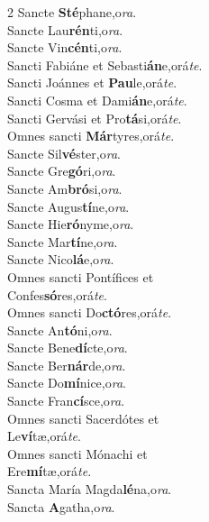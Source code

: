 \begin{multicols}{2}
San\-cte \textbf{Sté}phane,\hfill o\textit{ra}.\\
San\-cte Lau\textbf{rén}ti,\hfill o\textit{ra}.\\
San\-cte Vin\textbf{cén}ti,\hfill o\textit{ra}.\\
San\-cti Fabiáne et Sebasti\textbf{án}e,\hfill orá\textit{te}.\\
San\-cti Joánnes et \textbf{Pau}le,\hfill orá\textit{te}.\\
San\-cti Cosma et Dami\textbf{án}e,\hfill orá\textit{te}.\\
San\-cti Gervási et Pro\textbf{tá}si,\hfill orá\textit{te}.\\
Omnes san\-cti \textbf{Már}tyres,\hfill orá\textit{te}.\\
San\-cte Sil\textbf{vé}ster,\hfill o\textit{ra}.\\
San\-cte Gre\textbf{gó}ri,\hfill o\textit{ra}.\\
San\-cte Am\textbf{bró}si,\hfill o\textit{ra}.\\
San\-cte Augus\textbf{tí}ne,\hfill o\textit{ra}.\\
San\-cte Hie\textbf{ró}nyme,\hfill o\textit{ra}.\\
San\-cte Mar\textbf{tí}ne,\hfill o\textit{ra}.\\
San\-cte Nico\textbf{lá}e,\hfill o\textit{ra}.\\
Omnes san\-cti Pontífices et \\ \emspace Confes\textbf{só}res,\hfill orá\textit{te}.\\
Omnes san\-cti Do\textbf{ctó}res,\hfill orá\textit{te}.\\
San\-cte An\textbf{tó}ni,\hfill o\textit{ra}.\\
San\-cte Bene\textbf{dí}cte,\hfill o\textit{ra}.\\
San\-cte Ber\textbf{nár}de,\hfill o\textit{ra}.\\
San\-cte Do\textbf{mí}nice,\hfill o\textit{ra}.\\
San\-cte Fran\textbf{cí}sce,\hfill o\textit{ra}.\\
Omnes san\-cti Sacerdótes et \\  \emspace Le\textbf{ví}tæ,\hfill orá\textit{te}.\\
Omnes san\-cti Mónachi et \\ \emspace Ere\textbf{mí}tæ,\hfill orá\textit{te}.\\
San\-cta María Magda\textbf{lé}na,\hfill o\textit{ra}.\\
San\-cta \textbf{A}gatha,\hfill o\textit{ra}.\\

\end{multicols}
